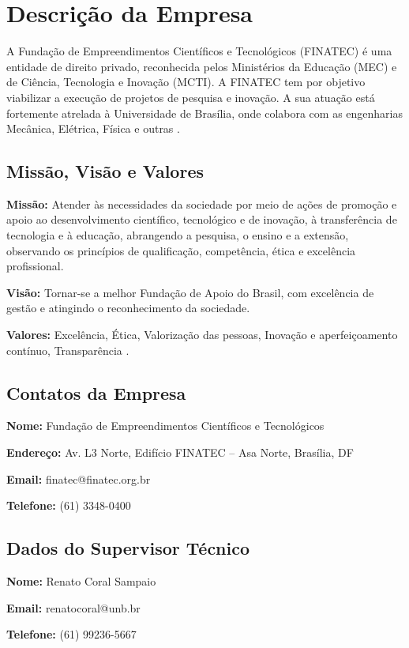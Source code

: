 \chapter[Descrição da Empresa]{Descrição da Empresa}
A Fundação de Empreendimentos Científicos e Tecnológicos (FINATEC) é uma
entidade de direito privado, reconhecida pelos Ministérios da Educação (MEC) e
de Ciência, Tecnologia e Inovação (MCTI). A FINATEC tem por
objetivo viabilizar a execução de projetos de pesquisa e inovação. A sua atuação
está fortemente atrelada à Universidade de Brasília, onde colabora com as
engenharias Mecânica, Elétrica, Física e outras \cite{finatec}.

\section{Missão, Visão e Valores}
\textbf{Missão:} Atender às necessidades da sociedade por meio de ações de
promoção e apoio ao desenvolvimento científico, tecnológico e de inovação, à
transferência de tecnologia e à educação, abrangendo a pesquisa, o ensino e a
extensão, observando os princípios de qualificação, competência, ética e
excelência profissional.

\textbf{Visão:} Tornar-se a melhor Fundação de Apoio do Brasil, com excelência
de gestão e atingindo o reconhecimento da sociedade.

\textbf{Valores:} Excelência, Ética, Valorização das pessoas, Inovação e
aperfeiçoamento contínuo, Transparência \cite{finatec}.

\section{Contatos da Empresa}
\textbf{Nome:} Fundação de Empreendimentos Científicos e Tecnológicos

\textbf{Endereço:} Av. L3 Norte, Edifício FINATEC – Asa Norte, Brasília, DF

\textbf{Email:} finatec@finatec.org.br


\textbf{Telefone:} (61) 3348-0400

\section{Dados do Supervisor Técnico}

\textbf{Nome:} Renato Coral Sampaio

\textbf{Email:} renatocoral@unb.br

\textbf{Telefone:} (61) 99236-5667
